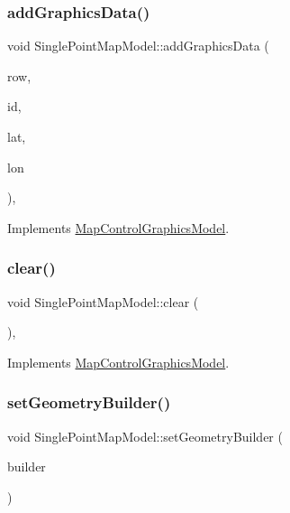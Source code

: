 \subsubsection{\texorpdfstring{addGraphicsData()}{addGraphicsData()}}
{\footnotesize\ttfamily void Single\+Point\+Map\+Model\+::add\+Graphics\+Data (\begin{DoxyParamCaption}\item[{int}]{row,  }\item[{int}]{id,  }\item[{float}]{lat,  }\item[{float}]{lon }\end{DoxyParamCaption})\hspace{0.3cm}{\ttfamily [override]}, {\ttfamily [virtual]}}



Implements \mbox{\hyperlink{class_map_control_graphics_model_ac80001f23a6059b9f8d600200920a5ea}{Map\+Control\+Graphics\+Model}}.

\mbox{\label{class_single_point_map_model_ae6778b1f7ed46f20b670dda409938266}} 
\subsubsection{\texorpdfstring{clear()}{clear()}}
{\footnotesize\ttfamily void Single\+Point\+Map\+Model\+::clear (\begin{DoxyParamCaption}{ }\end{DoxyParamCaption})\hspace{0.3cm}{\ttfamily [override]}, {\ttfamily [virtual]}}



Implements \mbox{\hyperlink{class_map_control_graphics_model_a2cfbe94a0c1124d5af186a75245de1e2}{Map\+Control\+Graphics\+Model}}.

\mbox{\label{class_single_point_map_model_a86233a22a69504679095a6b107ba4539}} 
\subsubsection{\texorpdfstring{setGeometryBuilder()}{setGeometryBuilder()}}
{\footnotesize\ttfamily void Single\+Point\+Map\+Model\+::set\+Geometry\+Builder (\begin{DoxyParamCaption}\item[{\mbox{\hyperlink{class_single_point_map_model_a8e106dd385dec04227af0acf17372916}{Single\+Point\+Map\+Model\+::\+Geometry\+Builder}}}]{builder }\end{DoxyParamCaption})}

